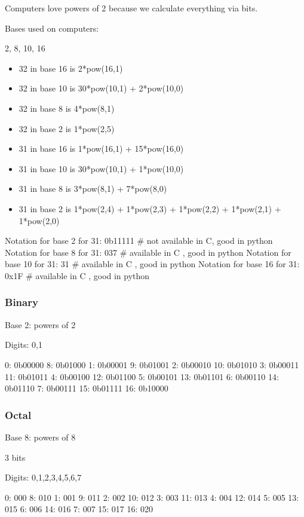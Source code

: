 \documentclass[11pt]{article}
\begin{document}
Computers love powers of 2 because we calculate everything via bits.

Bases used on computers:

2, 8, 10, 16

\begin{itemize}
\item 32 in base 16 is  2*pow(16,1)
\item 32 in base 10 is 30*pow(10,1) + 2*pow(10,0)
\item 32 in base 8 is   4*pow(8,1)
\item 32 in base 2 is   1*pow(2,5)

\item 31 in base 16 is  1*pow(16,1) + 15*pow(16,0)
\item 31 in base 10 is 30*pow(10,1) + 1*pow(10,0)
\item 31 in base 8 is   3*pow(8,1) + 7*pow(8,0)
\item 31 in base 2 is   1*pow(2,4) + 1*pow(2,3) + 1*pow(2,2) + 1*pow(2,1) + 1*pow(2,0)
\end{itemize}

Notation for base 2 for 31:  0b11111 \# not available in C, good in python
Notation for base 8 for 31:  037     \# available in C    , good in python
Notation for base 10 for 31: 31      \# available in C    , good in python
Notation for base 16 for 31: 0x1F    \# available in C    , good in python

\subsubsection{Binary}
\label{sec:org2045b3a}

Base 2: powers of 2

Digits: 0,1

0:  0b00000  8:  0b01000
1:  0b00001  9:  0b01001 
2:  0b00010 10:  0b01010 
3:  0b00011 11:  0b01011 
4:  0b00100 12:  0b01100
5:  0b00101 13:  0b01101
6:  0b00110 14:  0b01110         
7:  0b00111 15:  0b01111
            16:  0b10000
\subsubsection{Octal}
\label{sec:org2b8662b}

Base 8: powers of 8

3 bits

Digits: 0,1,2,3,4,5,6,7

0:  000  8: 010
1:  001  9: 011   
2:  002 10: 012   
3:  003 11: 013   
4:  004 12: 014  
5:  005 13: 015  
6:  006 14: 016           
7:  007 15: 017  
        16: 020
\end{document}
